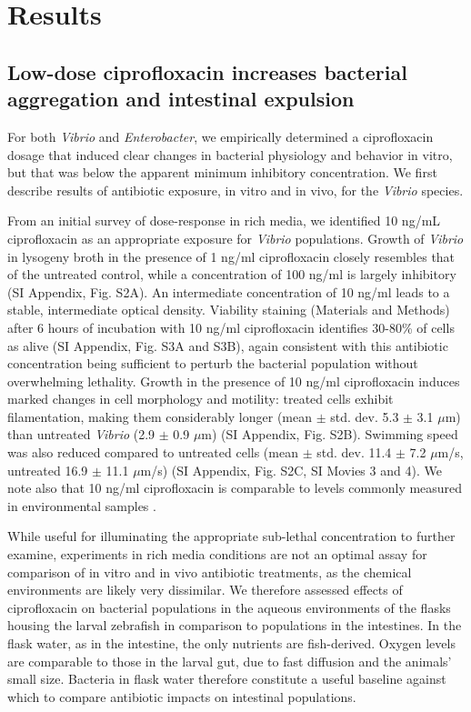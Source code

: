  \section{Results}

 \subsection{Low-dose ciprofloxacin increases bacterial aggregation and intestinal expulsion}

For both \textit{Vibrio} and \textit{Enterobacter}, we empirically determined a ciprofloxacin dosage that induced clear changes in bacterial physiology and behavior in vitro, but that was below the apparent minimum inhibitory concentration. We first describe results of antibiotic exposure, in vitro and in vivo, for the \textit{Vibrio} species. 

From an initial survey of dose-response in rich media, we identified 10 ng/mL ciprofloxacin as an appropriate exposure for \textit{Vibrio} populations. Growth of \textit{Vibrio} in lysogeny broth in the presence of 1 ng/ml ciprofloxacin closely resembles that of the untreated control, while a concentration of 100 ng/ml is largely inhibitory (SI Appendix, Fig. S2A). An intermediate concentration of 10 ng/ml leads to a stable, intermediate optical density. Viability staining (Materials and Methods) after 6 hours of incubation with 10 ng/ml ciprofloxacin identifies 30-80\% of cells as alive (SI Appendix, Fig. S3A and S3B), again consistent with this antibiotic concentration being sufficient to perturb the bacterial population without overwhelming lethality. Growth in the presence of 10 ng/ml ciprofloxacin induces marked changes in cell morphology and motility: treated cells exhibit filamentation, making them considerably longer (mean $\pm$ std. dev. 5.3 $\pm$ 3.1 $\mu$m) than untreated \textit{Vibrio} (2.9 $\pm$ 0.9 $\mu$m) (SI Appendix, Fig. S2B). Swimming speed was also reduced compared to untreated cells (mean $\pm$ std. dev. 11.4 $\pm$ 7.2 $\mu$m/s, untreated  16.9 $\pm$ 11.1 $\mu$m/s) (SI Appendix, Fig. S2C, SI Movies 3 and 4). We note also that 10 ng/ml ciprofloxacin is comparable to levels commonly measured in environmental samples \cite{girardi2011biodegradation}. 

While useful for illuminating the appropriate sub-lethal concentration to further examine, experiments in rich media conditions are not an optimal assay for comparison of in vitro and in vivo antibiotic treatments, as the chemical environments are likely very dissimilar. We therefore assessed effects of ciprofloxacin on bacterial populations in the aqueous environments of the flasks housing the larval zebrafish in comparison to populations in the intestines. In the flask water, as in the intestine, the only nutrients are fish-derived. Oxygen levels are  comparable to those in the larval gut, due to fast diffusion and the animals' small size. Bacteria in flask water therefore constitute a useful baseline against which to compare antibiotic impacts on intestinal populations.

